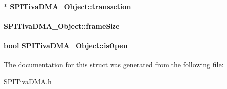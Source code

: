 \paragraph[{transaction}]{$\ast$ S\-P\-I\-Tiva\-D\-M\-A\-\_\-\-Object\-::transaction}\label{struct_s_p_i_tiva_d_m_a___object_a6cdc7c21c1b929e2a2f3956072bd444f}
\paragraph[{frame\-Size}]{ S\-P\-I\-Tiva\-D\-M\-A\-\_\-\-Object\-::frame\-Size}\label{struct_s_p_i_tiva_d_m_a___object_a3f59d2d7fe94828380dda940e0ccdcdd}
\paragraph[{is\-Open}]{\setlength{\rightskip}{0pt plus 5cm}bool S\-P\-I\-Tiva\-D\-M\-A\-\_\-\-Object\-::is\-Open}\label{struct_s_p_i_tiva_d_m_a___object_a6df49861408f17545708084630dfca22}


The documentation for this struct was generated from the following file\-:\begin{DoxyCompactItemize}
\item 
\hyperlink{_s_p_i_tiva_d_m_a_8h}{S\-P\-I\-Tiva\-D\-M\-A.\-h}\end{DoxyCompactItemize}
